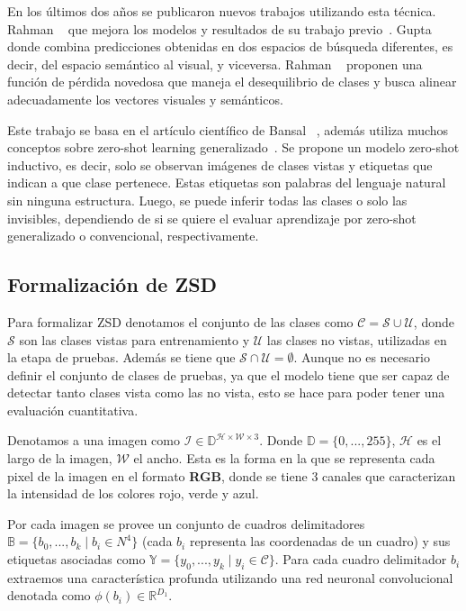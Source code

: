 En los últimos dos años se publicaron nuevos trabajos utilizando esta técnica. Rahman \etal~\cite{rahman2020zero} que mejora los modelos y resultados de su trabajo previo~\cite{rahman2018zero}. Gupta \etal~\cite{gupta2020multi} donde combina predicciones obtenidas en dos espacios de búsqueda diferentes, es decir, del espacio semántico al visual, y viceversa. Rahman \etal~\cite{rahman2020improved} proponen  una función de pérdida novedosa que maneja el desequilibrio de clases y busca alinear adecuadamente los vectores visuales y semánticos.

Este trabajo se basa en el artículo científico de Bansal \etal ~\cite{bansal2018zero}, además utiliza muchos conceptos sobre zero-shot learning generalizado~\cite{zero-shot-generalizado}. Se propone un modelo zero-shot  inductivo, es decir, solo se observan imágenes de clases vistas y etiquetas que indican a que clase pertenece. Estas etiquetas son palabras del lenguaje natural sin ninguna estructura. Luego, se puede inferir todas las clases o solo las invisibles, dependiendo de si se quiere el evaluar aprendizaje por zero-shot  generalizado o convencional, respectivamente.\\ 

\subsection{Formalización de ZSD} \label{ssec:formalizaciondezsd}
Para formalizar ZSD denotamos el conjunto de las clases como $\mathcal{C} = \mathcal{S} \cup \mathcal{U}$, donde $\mathcal{S}$ son las clases vistas para entrenamiento y $\mathcal{U}$ las clases no vistas, utilizadas en la etapa de pruebas. Además se tiene que $\mathcal{S} \cap \mathcal{U} = \emptyset$. Aunque no es necesario definir el conjunto de clases de pruebas, ya que el modelo tiene que ser capaz de detectar tanto clases vista como las no vista, esto se hace para poder tener una evaluación cuantitativa.

Denotamos a una imagen como $\mathcal{I} \in \mathbb{D}^{\mathcal{H} \times \mathcal{W} \times 3}$. Donde $\mathbb{D} = \{0,...,255\}$, $\mathcal{H}$  es el largo de la imagen, $\mathcal{W}$ el ancho. Esta es la forma en la que se representa cada pixel de la imagen en el formato \textbf{RGB}, donde se tiene 3 canales que caracterizan la intensidad de los colores rojo, verde y azul. 

Por cada imagen se provee un conjunto de cuadros delimitadores $\mathbb{B} = \{b_0,...,b_k\mid b_i \in N^4\}$ (cada $b_i$ representa las coordenadas de un cuadro) y sus etiquetas asociadas como $\mathbb{Y} = \{y_0,...,y_k\mid y_i \in \mathcal{C}\}$. Para cada cuadro delimitador $b_i$ extraemos una característica profunda utilizando una red neuronal convolucional denotada como $\phi(b_i) \in \mathbb{R}^{D_1}$. 

